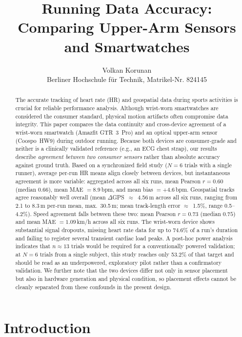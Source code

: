 \documentclass{acmsiggraph}
\title{Running Data Accuracy: Comparing Upper-Arm Sensors and Smartwatches}
\author{Volkan Korunan\\Berliner Hochschule f\"ur Technik, Matrikel-Nr. 824145}
\begin{document}
	
	\maketitle
	
	\begin{abstract}
		The accurate tracking of heart rate (HR) and geospatial data during sports
		activities is crucial for reliable performance analysis. Although
		wrist-worn smartwatches are considered the consumer standard, physical
		motion artifacts often compromise data integrity. This paper compares the
		data continuity and cross-device agreement of a wrist-worn smartwatch
		(Amazfit GTR~3~Pro) and an optical upper-arm sensor (Coospo~HW9) during
		outdoor running. Because both devices are consumer-grade and neither is a
		clinically validated reference (e.g., an ECG chest strap), our results
		describe \emph{agreement between two consumer sensors} rather than
		absolute accuracy against ground truth. Based on a synchronized field
		study ($N=6$ trials with a single runner), average per-run HR means align
		closely between devices, but instantaneous agreement is more variable:
		aggregated across all six runs, mean Pearson $r=0.60$ (median $0.66$),
		mean MAE $=8.9$\,bpm, and mean bias $=+4.6$\,bpm. Geospatial tracks agree
		reasonably well overall (mean $\Delta$GPS~$\approx$~4.56\,m across all
		six runs, ranging from 2.1 to 8.3\,m per-run mean, max.\ 30.5\,m; mean
		track-length error $\approx$~1.5\%, range 0.5--4.2\%). Speed agreement
		falls between these two: mean Pearson $r=0.73$ (median $0.75$) and mean
		MAE $=1.09$\,km/h across all six runs. The wrist-worn device shows
		substantial signal dropouts, missing heart rate data for up to 74.6\% of
		a run's duration and failing to register several transient cardiac load
		peaks. A post-hoc power analysis indicates that $n\approx13$ trials would
		be required for a conventionally powered validation; at $N=6$ trials from
		a single subject, this study reaches only 53.2\% of that target and
		should be read as an underpowered, exploratory pilot rather than a
		confirmatory validation. We further note that the two devices differ not
		only in sensor placement but also in hardware generation and physical
		condition, so placement effects cannot be cleanly separated from these
		confounds in the present design.
	\end{abstract}
	
	\section{Introduction}
	
\end{document}
